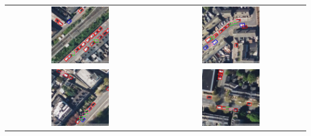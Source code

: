 \begin{table}[h]
  \centering
  \begin{tabular}{cc}
    \includegraphics[width=0.4\textwidth]{images/image1_empty_parking_detection_test_set.png} & \includegraphics[width=0.4\textwidth]{images/image2_empty_parking_detection_test_set.png} \\
    \includegraphics[width=0.4\textwidth]{images/image3_empty_parking_detection_test_set.png} & \includegraphics[width=0.4\textwidth]{images/image4_empty_parking_detection_test_set.png} \\

\end{tabular}
\end{table}
